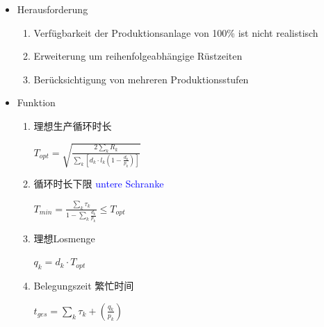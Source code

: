 \documentclass[12pt, letterpaper]{article}
\begin{document}
\begin{CJK*}{UTF8}{gbsn}
\begin{itemize}

\item Herausforderung
\begin{enumerate}
\item Verfügbarkeit der Produktionsanlage von 100\% ist nicht realistisch
\item Erweiterung um reihenfolgeabhängige Rüstzeiten
\item Berücksichtigung von mehreren Produktionsstufen

\end{enumerate}


\item Funktion

\begin{enumerate}

\item 理想生产循环时长
\begin{center}
$T_{opt}=\sqrt{\frac{2\sum_kR_k}{\sum_k [d_k \cdot l_k(1-\frac{d_k}{p_k})]}}  $
\end{center}


\item 循环时长下限 \textcolor{blue}{untere Schranke}
\begin{center}
$T_{min}=\frac{\sum_k \tau_k}{1-\sum_k\frac{d_k}{p_k}} \leq T_{opt}$
\end{center}


\item 理想Losmenge
\begin{center}
$q_k=d_k\cdot T_{opt}$
\end{center}


\item Belegungszeit 繁忙时间
\begin{center}
$t_{ges}=\sum_k \tau_k + (\frac{q_k}{p_k})$
\end{center}


\end{enumerate}

\end{itemize}



\end{CJK*}
\end{document}
